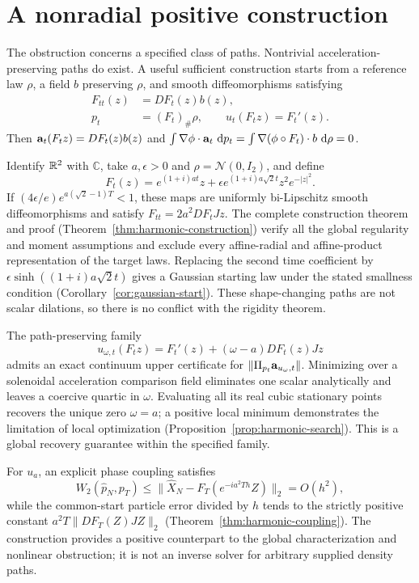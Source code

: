 \section{A nonradial positive construction}
\label{sec:positive-summary}

The obstruction concerns a specified class of paths.  Nontrivial
acceleration-preserving paths do exist.  A useful sufficient construction
starts from a reference law $\rho$, a field $b$ preserving $\rho$, and
smooth diffeomorphisms satisfying
\begin{equation}
 \begin{aligned}
 F_{tt}(z)&=DF_t(z)b(z),\\
 p_t&=(F_t)_\#\rho,\qquad u_t(F_tz)=F_t'(z).
 \end{aligned}
 \label{eq:reference-summary}
\end{equation}
Then $\mathbf a_t(F_tz)=DF_t(z)b(z)$ and
$\int\nabla\phi\cdot\mathbf a_t\,\,\mathrm d p_t
=\int\nabla(\phi\circ F_t)\cdot b\,\,\mathrm d\rho=0$.

Identify $\mathbb R^2$ with $\mathbb C$, take $a,\epsilon>0$ and
$\rho=\mathcal N(0,I_2)$, and define
\begin{equation}
 F_t(z)=e^{(1+i)at}z+\epsilon e^{(1+i)a\sqrt2t}z^2e^{-|z|^2}.
 \label{eq:positive-summary-map}
\end{equation}
If $(4\epsilon/e)e^{a(\sqrt2-1)T}<1$, these maps are uniformly
bi-Lipschitz smooth diffeomorphisms and satisfy
$F_{tt}=2a^2DF_tJz$.  The complete construction theorem and proof
(Theorem~\ref{thm:harmonic-construction}) verify all the global
regularity and moment assumptions and exclude every affine-radial and
affine-product representation of the target laws.  Replacing the second
time coefficient by $\epsilon\sinh((1+i)a\sqrt2t)$ gives a Gaussian
starting law under the stated smallness condition
(Corollary~\ref{cor:gaussian-start}).  These shape-changing paths are not
scalar dilations, so there is no conflict with the rigidity theorem.

The path-preserving family
\[
 u_{\omega,t}(F_tz)=F_t'(z)+(\omega-a)DF_t(z)Jz
\]
admits an exact continuum upper certificate for
$\|\Pi_{p_t}\mathbf a_{u_\omega,t}\|$.  Minimizing over a solenoidal
acceleration comparison field eliminates one scalar analytically and
leaves a coercive quartic in $\omega$.  Evaluating all its real cubic
stationary points recovers the unique zero $\omega=a$; a positive local
minimum demonstrates the limitation of local optimization
(Proposition~\ref{prop:harmonic-search}).  This is a global recovery
guarantee within the specified family.

For $u_a$, an explicit phase coupling satisfies
\[
 W_2(\widehat p_N,p_T)
 \le\|\widehat X_N-F_T(e^{-ia^2Th}Z)\|_2=O(h^2),
\]
while the common-start particle error divided by $h$ tends to the
strictly positive constant
$a^2T\|DF_T(Z)JZ\|_2$ (Theorem~\ref{thm:harmonic-coupling}).
The construction provides a positive counterpart to the global
characterization and nonlinear obstruction; it is not an inverse solver
for arbitrary supplied density paths.
